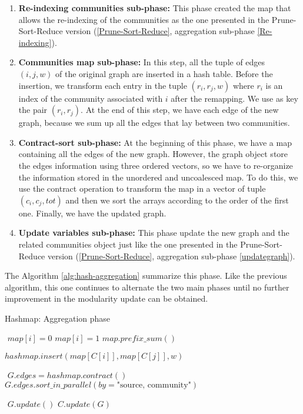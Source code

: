 \begin{enumerate}
	\item \textbf{Re-indexing communities sub-phase:} This phase created the map that allows the re-indexing of the communities as the one presented in the Prune-Sort-Reduce version (\ref{Prune-Sort-Reduce}, aggregation sub-phase \ref{Re-indexing}).
	\item \textbf{Communities map sub-phase:} In this step, all the tuple of edges $(i, j, w)$ of the original graph are inserted in a hash table. Before the insertion, we transform each entry in the tuple $(r_i, r_j, w)$ where $r_i$ is an index of the community associated with $i$ after the remapping. We use as key the pair $(r_i, r_j)$. At the end of this step, we have each edge of the new graph, because we sum up all the edges that lay between two communities.
	\item \textbf{Contract-sort sub-phase:} At the beginning of this phase, we have a map containing all the edges of the new graph. However, the graph object store the edges information using three ordered vectors, so we have to re-organize the information stored in the unordered and uncoalesced map. To do this, we use the contract operation to transform the map in a vector of tuple $(c_i, c_j, tot)$ and then we sort the arrays according to the order of the first one. Finally, we have the updated graph.
	\item \textbf{Update variables sub-phase:} This phase update the new graph and the related communities object just like the one presented in the Prune-Sort-Reduce version (\ref{Prune-Sort-Reduce}, aggregation sub-phase \ref{updategraph}).
\end{enumerate}
The Algorithm \ref{alg:hash-aggregation} summarize this phase. 
Like the previous algorithm, this one continues to alternate the two main phases until no further improvement in the modularity update can be obtained.
\begin{algorithm}
	\caption{Hashmap: Aggregation phase}\label{alg:hash-aggregation}
	\begin{algorithmic}
		\State $ $
		\State $map[i] = 0$
		\Else
		\State $map[i] = 1$
		\EndIf
		\EndFor 
		\State $map.prefix\_sum()$
		\State $ $
		
			\State $hashmap.insert(map[C[i]],map[C[j]],w)$
		\EndFor 
		
		\State $ $
		\State $G.edges = hashmap.contract()$
		\State $G.edges.sort\_in\_parallel(by= \text{"source, community"})$
		\State 
		
		\State $ $
		\State $G.update()$
		\State $C.update(G)$
		
		\EndProcedure
	\end{algorithmic}
\end{algorithm}

